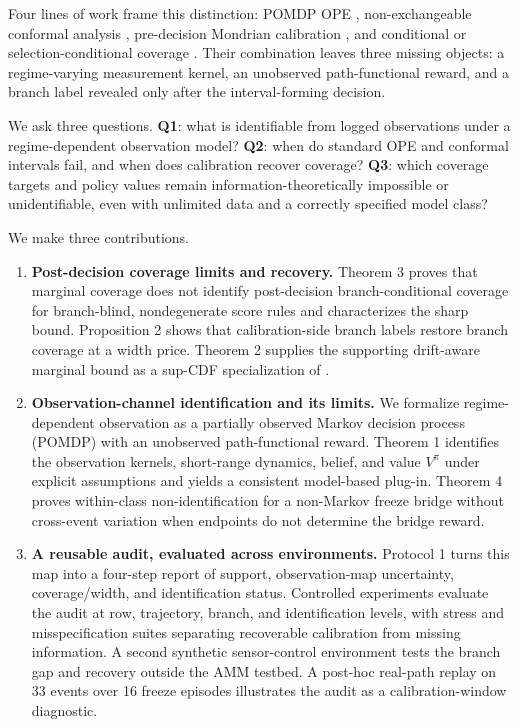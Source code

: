 Four lines of work frame this distinction: POMDP OPE \cite{shi2022,uehara2023,zhang2024,zhang2025,luo2026}, non-exchangeable conformal analysis \cite{barber2023}, pre-decision Mondrian calibration \cite{vovk2005,lei2018}, and conditional or selection-conditional coverage \cite{barber2021,jin2024jomi,lakkaraju2017}. Their combination leaves three missing objects: a regime-varying measurement kernel, an unobserved path-functional reward, and a branch label revealed only after the interval-forming decision.

We ask three questions. \textbf{Q1}: what is identifiable from logged observations under a regime-dependent observation model? \textbf{Q2}: when do standard OPE and conformal intervals fail, and when does calibration recover coverage? \textbf{Q3}: which coverage targets and policy values remain information-theoretically impossible or unidentifiable, even with unlimited data and a correctly specified model class?

We make three contributions.

\begin{enumerate}
\item \textbf{Post-decision coverage limits and recovery.} Theorem 3 proves that marginal coverage does not identify post-decision branch-conditional coverage for branch-blind, nondegenerate score rules and characterizes the sharp bound. Proposition 2 shows that calibration-side branch labels restore branch coverage at a width price. Theorem 2 supplies the supporting drift-aware marginal bound as a sup-CDF specialization of \cite{barber2023}.
\item \textbf{Observation-channel identification and its limits.} We formalize regime-dependent observation as a partially observed Markov decision process (POMDP) with an unobserved path-functional reward. Theorem 1 identifies the observation kernels, short-range dynamics, belief, and value $V^\pi$ under explicit assumptions and yields a consistent model-based plug-in. Theorem 4 proves within-class non-identification for a non-Markov freeze bridge without cross-event variation when endpoints do not determine the bridge reward.
\item \textbf{A reusable audit, evaluated across environments.} Protocol 1 turns this map into a four-step report of support, observation-map uncertainty, coverage/width, and identification status. Controlled experiments evaluate the audit at row, trajectory, branch, and identification levels, with stress and misspecification suites separating recoverable calibration from missing information. A second synthetic sensor-control environment tests the branch gap and recovery outside the AMM testbed. A post-hoc real-path replay on 33 events over 16 freeze episodes illustrates the audit as a calibration-window diagnostic.
\end{enumerate}

